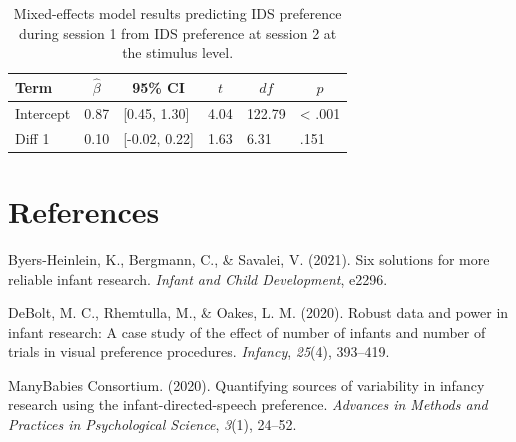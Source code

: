 \documentclass[
  man, donotrepeattitle,floatsintext]{apa6}
\newlength{\cslhangindent}
\newlength{\cslentryspacingunit} %
\newenvironment{CSLReferences}[2] %
 {%
  \setlength{\parindent}{0pt}
  \ifodd #1
  \let\oldpar\par
  \def\par{\hangindent=\cslhangindent\oldpar}
  \fi
  \setlength{\parskip}{#2\cslentryspacingunit}
 }%
 {}
\begin{document}
\begin{table}[tbp]

\begin{center}
\begin{threeparttable}

\caption{\label{tab:unnamed-chunk-12}Mixed-effects model results predicting IDS preference during session 1 from IDS preference at session 2 at the stimulus level.}

\begin{tabular}{llllll}
\toprule
Term & \multicolumn{1}{c}{$\hat{\beta}$} & \multicolumn{1}{c}{95\% CI} & \multicolumn{1}{c}{$t$} & \multicolumn{1}{c}{$\mathit{df}$} & \multicolumn{1}{c}{$p$}\\
\midrule
Intercept & 0.87 & {}[0.45, 1.30] & 4.04 & 122.79 & < .001\\
Diff 1 & 0.10 & {}[-0.02, 0.22] & 1.63 & 6.31 & .151\\
\bottomrule
\end{tabular}

\end{threeparttable}
\end{center}

\end{table}

\newpage

\hypertarget{references}{%
\section{References}\label{references}}

\begingroup
\setlength{\parindent}{-0.5in}
\setlength{\leftskip}{0.5in}

\hypertarget{refs}{}
\begin{CSLReferences}{1}{0}
\leavevmode{}%
Byers-Heinlein, K., Bergmann, C., \& Savalei, V. (2021). Six solutions for more reliable infant research. \emph{Infant and Child Development}, e2296.

\leavevmode{}%
DeBolt, M. C., Rhemtulla, M., \& Oakes, L. M. (2020). Robust data and power in infant research: A case study of the effect of number of infants and number of trials in visual preference procedures. \emph{Infancy}, \emph{25}(4), 393--419.

\leavevmode{}%
ManyBabies Consortium. (2020). Quantifying sources of variability in infancy research using the infant-directed-speech preference. \emph{Advances in Methods and Practices in Psychological Science}, \emph{3}(1), 24--52.

\end{CSLReferences}

\endgroup
\end{document}
